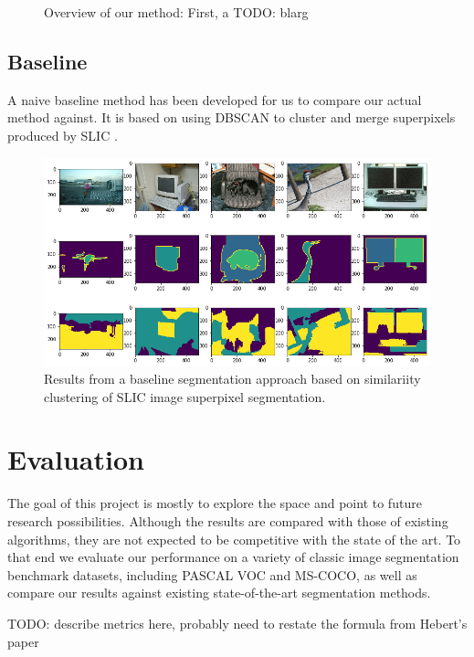 \documentclass[twocolumn]{article}
\newcommand{\todo}[1]{}
\renewcommand{\todo}[1]{{\color{red} TODO: {#1}}}
\newcommand{\seclab}[1]{\label{sec:#1}}
\newcommand{\figlab}[1]{\label{fig:#1}}
\begin{document}
\begin{figure}
  \caption{
    Overview of our method: First, a \todo{blarg}
  }
  \figlab{process}

\end{figure}

\subsection{Baseline}

A naive baseline method has been developed for us to compare our actual method
against. It is based on using DBSCAN \cite{ester1996density} to cluster and
merge superpixels produced by SLIC \cite{achanta2010slic}.

\begin{figure}

\centering
\includegraphics[width=\linewidth]{figs/searched.png}
\caption{Results from a baseline segmentation approach based on similariity
clustering of SLIC image superpixel segmentation.}
\figlab{baseline}

\end{figure}

\section{Evaluation}\seclab{eval}

The goal of this project is mostly to explore the space and point to future
research possibilities. Although the results are compared with those of
existing algorithms, they are not expected to be competitive with the state of
the art. To that end we evaluate our performance on a variety of classic
image segmentation benchmark datasets, including PASCAL VOC and MS-COCO, as well
as compare our results against existing state-of-the-art segmentation methods. 

\todo{describe metrics here, probably need to restate the formula from Hebert's paper}
\end{document}
